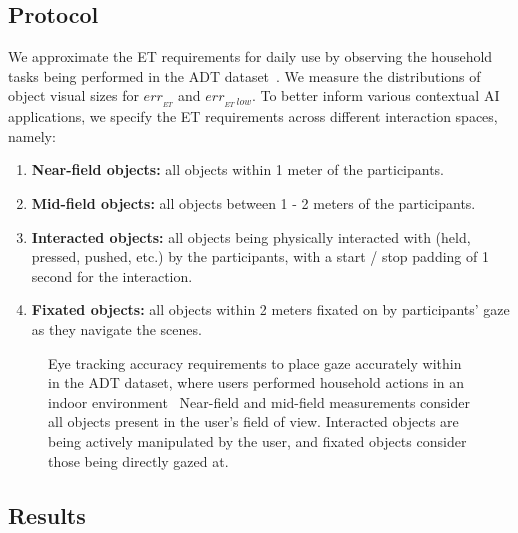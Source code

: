 \subsection{Protocol}

We approximate the ET requirements for daily use by observing the household tasks being performed in the ADT dataset~\cite{pan_adt_2023}.  We measure the distributions of object visual sizes for $err_{{}_{ET}}$ and $err_{{}_{ET}\ low}$.  To better inform various contextual AI applications, we specify the ET requirements across different interaction spaces, namely:
\begin{enumerate}  [topsep=0pt]
    \item \textbf{Near-field objects:} all objects within 1 meter of the participants.
    \item \textbf{Mid-field objects:} all objects between 1 - 2 meters of the participants.
    \item \textbf{Interacted objects:} all objects being physically interacted with (held, pressed, pushed, etc.) by the participants, with a start / stop padding of 1 second for the interaction.
    \item \textbf{Fixated objects:} all objects within 2 meters fixated on by participants' gaze as they navigate the scenes.
\end{enumerate}

\begin{figure}[t]
    \centering
    \caption{Eye tracking accuracy requirements to place gaze accurately within in the ADT dataset, where users performed household actions in an indoor environment~\cite{pan_adt_2023}  Near-field and mid-field measurements consider all objects present in the user's field of view.  Interacted objects are being actively manipulated by the user, and fixated objects consider those being directly gazed at.}
    \label{fig:visual_sizes}
\end{figure}

\subsection{Results}
\label{sec:accuracy_results}

